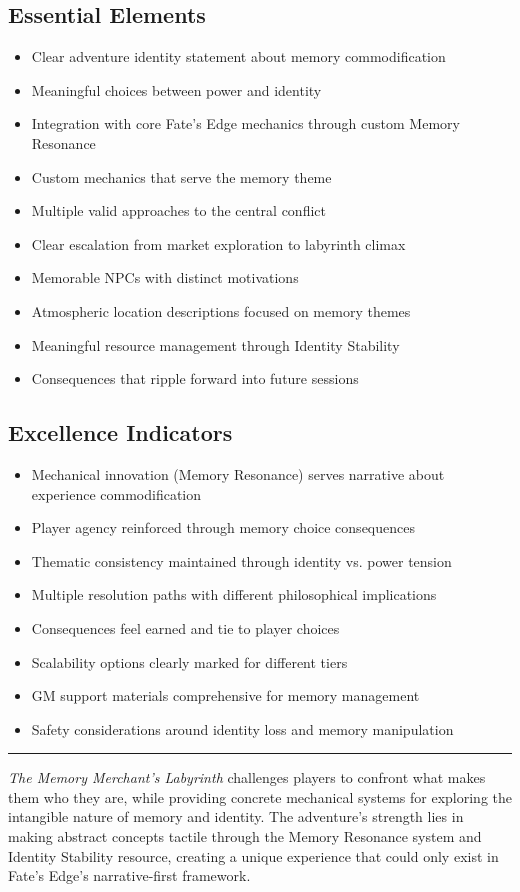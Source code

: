 \documentclass[11pt]{article}
\begin{document}
\subsection*{Essential Elements}
\begin{itemize}[leftmargin=*]
  \item [x] Clear adventure identity statement about memory commodification
  \item [x] Meaningful choices between power and identity
  \item [x] Integration with core Fate's Edge mechanics through custom Memory Resonance
  \item [x] Custom mechanics that serve the memory theme
  \item [x] Multiple valid approaches to the central conflict
  \item [x] Clear escalation from market exploration to labyrinth climax
  \item [x] Memorable NPCs with distinct motivations
  \item [x] Atmospheric location descriptions focused on memory themes
  \item [x] Meaningful resource management through Identity Stability
  \item [x] Consequences that ripple forward into future sessions
\end{itemize}

\subsection*{Excellence Indicators}
\begin{itemize}[leftmargin=*]
  \item [x] Mechanical innovation (Memory Resonance) serves narrative about experience commodification
  \item [x] Player agency reinforced through memory choice consequences
  \item [x] Thematic consistency maintained through identity vs. power tension
  \item [x] Multiple resolution paths with different philosophical implications
  \item [x] Consequences feel earned and tie to player choices
  \item [x] Scalability options clearly marked for different tiers
  \item [x] GM support materials comprehensive for memory management
  \item [x] Safety considerations around identity loss and memory manipulation
\end{itemize}

\vspace{1em}
\noindent\rule{\textwidth}{0.4pt}

\textit{The Memory Merchant's Labyrinth} challenges players to confront what makes them who they are, while providing concrete mechanical systems for exploring the intangible nature of memory and identity. The adventure's strength lies in making abstract concepts tactile through the Memory Resonance system and Identity Stability resource, creating a unique experience that could only exist in Fate's Edge's narrative-first framework.


\end{document}
